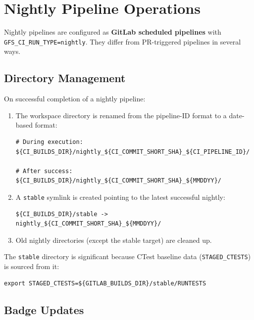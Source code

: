 \documentclass[11pt,letterpaper,twoside]{article}
\begin{document}
\section{Nightly Pipeline Operations}
\label{sec:nightly}

Nightly pipelines are configured as \textbf{GitLab scheduled pipelines} with
\texttt{GFS\_CI\_RUN\_TYPE=nightly}. They differ from PR-triggered pipelines in
several ways.

\subsection{Directory Management}
\label{sec:nightly-dirs}

On successful completion of a nightly pipeline:

\begin{enumerate}[leftmargin=1.5em]
  \item The workspace directory is renamed from the pipeline-ID format to a
    date-based format:
    \begin{lstlisting}[style=bash, numbers=none]
# During execution:
${CI_BUILDS_DIR}/nightly_${CI_COMMIT_SHORT_SHA}_${CI_PIPELINE_ID}/

# After success:
${CI_BUILDS_DIR}/nightly_${CI_COMMIT_SHORT_SHA}_${MMDDYY}/
    \end{lstlisting}

  \item A \texttt{stable} symlink is created pointing to the latest successful
    nightly:
    \begin{lstlisting}[style=bash, numbers=none]
${CI_BUILDS_DIR}/stable -> nightly_${CI_COMMIT_SHORT_SHA}_${MMDDYY}/
    \end{lstlisting}

  \item Old nightly directories (except the stable target) are cleaned up.
\end{enumerate}

The \texttt{stable} directory is significant because CTest baseline data
(\texttt{STAGED\_CTESTS}) is sourced from it:

\begin{lstlisting}[style=bash, numbers=none]
export STAGED_CTESTS=${GITLAB_BUILDS_DIR}/stable/RUNTESTS
\end{lstlisting}

\subsection{Badge Updates}
\label{sec:badges}
\end{document}
